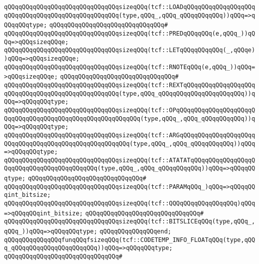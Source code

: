 \verb|qQQqqQQqqQQqqQQqqQQqqQQqqQQqqQQqsizeqQQq(tcf::LOADqQQqqQQqqQQqqQQqqQQqqQQqqQQqqQQqqQQqqQQqqQQqqQQqqQQq(type,qQQq_,qQQq_qQQqqQQqqQQq))qQQq=>qQQqqQQqtype;|\newline
\verb|qQQqqQQqqQQqqQQqqQQqqQQqqQQqqQQq#|\newline
\verb|qQQqqQQqqQQqqQQqqQQqqQQqqQQqqQQqsizeqQQq(tcf::PREDqQQqqQQq(e,qQQq_))qQQq=>qQQqsizeqQQqe;|\newline
\verb|qQQqqQQqqQQqqQQqqQQqqQQqqQQqqQQqsizeqQQq(tcf::LETqQQqqQQqqQQq(_,qQQqe))qQQq=>qQQqsizeqQQqe;|\newline
\verb|qQQqqQQqqQQqqQQqqQQqqQQqqQQqqQQqsizeqQQq(tcf::RNOTEqQQq(e,qQQq_))qQQq=>qQQqsizeqQQqe;|\newline
\verb|qQQqqQQqqQQqqQQqqQQqqQQqqQQqqQQq#|\newline
\verb|qQQqqQQqqQQqqQQqqQQqqQQqqQQqqQQqsizeqQQq(tcf::REXTqQQqqQQqqQQqqQQqqQQqqQQqqQQqqQQqqQQqqQQqqQQqqQQqqQQq(type,qQQq_qQQqqQQqqQQqqQQqqQQqqQQq))qQQq=>qQQqqQQqtype;|\newline
\verb|qQQqqQQqqQQqqQQqqQQqqQQqqQQqqQQqsizeqQQq(tcf::OPqQQqqQQqqQQqqQQqqQQqqQQqqQQqqQQqqQQqqQQqqQQqqQQqqQQqqQQqqQQq(type,qQQq_,qQQq_qQQqqQQqqQQq))qQQq=>qQQqqQQqtype;|\newline
\verb|qQQqqQQqqQQqqQQqqQQqqQQqqQQqqQQqsizeqQQq(tcf::ARGqQQqqQQqqQQqqQQqqQQqqQQqqQQqqQQqqQQqqQQqqQQqqQQqqQQqqQQq(type,qQQq_,qQQq_qQQqqQQqqQQq))qQQq=>qQQqqQQqtype;|\newline
\verb|qQQqqQQqqQQqqQQqqQQqqQQqqQQqqQQqsizeqQQq(tcf::ATATATqQQqqQQqqQQqqQQqqQQqqQQqqQQqqQQqqQQqqQQqqQQq(type,qQQq_,qQQq_qQQqqQQqqQQq))qQQq=>qQQqqQQqtype;|\newline
\verb|qQQqqQQqqQQqqQQqqQQqqQQqqQQqqQQq#|\newline
\verb|qQQqqQQqqQQqqQQqqQQqqQQqqQQqqQQqsizeqQQq(tcf::PARAMqQQq_)qQQq=>qQQqqQQqint_bitsize;|\newline
\verb|qQQqqQQqqQQqqQQqqQQqqQQqqQQqqQQqsizeqQQq(tcf::QQQqQQqqQQqqQQqqQQq)qQQq=>qQQqqQQqint_bitsize;|\newline
\verb|qQQqqQQqqQQqqQQqqQQqqQQqqQQqqQQq#|\newline
\verb|qQQqqQQqqQQqqQQqqQQqqQQqqQQqqQQqsizeqQQq(tcf::BITSLICEqQQq(type,qQQq_,qQQq_))qQQq=>qQQqqQQqtype;|\newline
\verb|qQQqqQQqqQQqqQQqend;|\newline
\newline
\verb|qQQqqQQqqQQqqQQqfunqQQqfsizeqQQq(tcf::CODETEMP_INFO_FLOATqQQq(type,qQQq_qQQqqQQqqQQqqQQqqQQqqQQq))qQQq=>qQQqqQQqtype;|\newline
\verb|qQQqqQQqqQQqqQQqqQQqqQQqqQQqqQQq#|\newline
